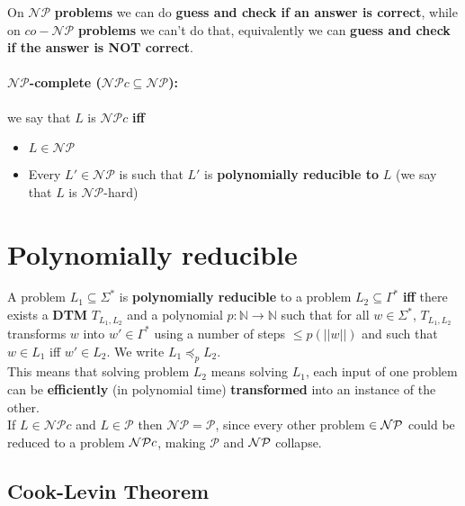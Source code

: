 	On $\mathcal{NP}$ \textbf{problems} we can do \textbf{guess and check if an answer is correct}, while on $co-\mathcal{NP}$ \textbf{problems} we can't do that, equivalently we can \textbf{guess and check if the answer is NOT correct}.\\


	\paragraph{$\mathcal{NP}$-complete ($\mathcal{NP}c \subseteq \mathcal{NP}$):} we say that $L$ is $\mathcal{NP}c$ \textbf{iff}
	\begin{itemize}
		\item $L \in \mathcal{NP}$
		\item Every $L' \in \mathcal{NP}$ is such that $L'$ is \textbf{polynomially reducible to} $L$ (we say that $L$ is $\mathcal{NP}$-hard)
	\end{itemize}

	\section{Polynomially reducible}

	A problem $L_1 \subseteq \Sigma^\ast$ is \textbf{polynomially reducible} to a problem $L_2 \subseteq \Gamma^\ast$ \textbf{iff} there exists a \textbf{DTM} $T_{L_1, L_2}$ and a polynomial $p : \mathbb{N} \rightarrow \mathbb{N}$ such that for all $w \in \Sigma^\ast$, $T_{L_1, L_2}$ transforms $w$ into $w' \in \Gamma^\ast$ using a number of steps $\leq p (||w||)$ and such that $w \in L_1$ iff $w' \in L_2$. We write $L_1 \preceq_p L_2$.\\

	This means that solving problem $L_2$ means solving $L_1$, each input of one problem can be \textbf{efficiently} (in polynomial time) \textbf{transformed} into an instance of the other.\\

	If $L \in \mathcal{NP}c$ and $L \in \mathcal{P}$ then $\mathcal{NP} = \mathcal{P}$, since every other problem $\in \mathcal{NP}$ could be reduced to a problem $\mathcal{NP} c$, making $\mathcal{P}$ and $\mathcal{NP}$ collapse.\\

	\newpage

	\subsection{Cook-Levin Theorem}

